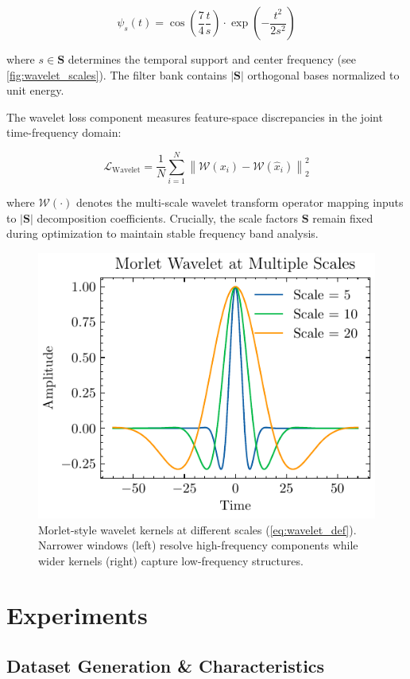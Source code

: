 \documentclass[12pt]{article}
\begin{document}
\begin{equation}
    \psi_s(t) = \cos\left(\frac{7}{4}\frac{t}{s}\right) \cdot \exp\left(-\frac{t^2}{2s^2}\right)
    \label{eq:wavelet_def}
\end{equation}

where $s \in \mathbf{S}$ determines the temporal support and center frequency (see \autoref{fig:wavelet_scales}). The filter bank contains $|\mathbf{S}|$ orthogonal bases normalized to unit energy.


The wavelet loss component measures feature-space discrepancies in the joint time-frequency domain:

\begin{equation}
    \mathcal{L}_{\text{Wavelet}} = \frac{1}{N}\sum_{i=1}^{N} \left\lVert \mathcal{W}(x_i) - \mathcal{W}(\hat{x}_i) \right\rVert_2^2
    \label{eq:wavelet_loss}
\end{equation}

where $\mathcal{W}(\cdot)$ denotes the multi-scale wavelet transform operator mapping inputs to $|\mathbf{S}|$ decomposition coefficients. Crucially, the scale factors $\mathbf{S}$ remain fixed during optimization to maintain stable frequency band analysis.



\begin{figure}[htbp]
    \centering
    \includegraphics[width=0.5\linewidth]{wavelet-scales.pdf}
    \caption{Morlet-style wavelet kernels at different scales (\autoref{eq:wavelet_def}). Narrower windows (left) resolve high-frequency components while wider kernels (right) capture low-frequency structures.}
    \label{fig:wavelet_scales}
\end{figure}

\section{Experiments}

\subsection{Dataset Generation \& Characteristics}
\label{sec:dataset}
\end{document}
